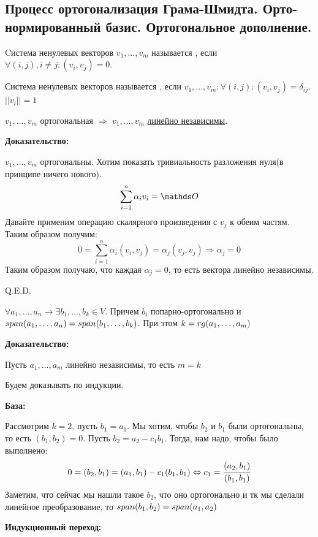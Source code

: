 \pagebreak
\subsection{Процесс ортогонализация Грама-Шмидта. Орто-нормированный базис. Ортогональное дополнение.}

 Cистема ненулевых векторов $v_1,\ldots, v_m$ называется , если $\forall (i,j), i\neq j: (v_i,v_j) =0$.  



 Система ненулевых векторов называется , если $v_1,\ldots, v_m: \forall (i,j): (v_i,v_j) = \delta_{ij}$. $||v_i||= 1$

 $v_1,\ldots, v_m$ ортогональная $\Rightarrow$ $v_1,\ldots , v_m$ \uline{линейно независимы}.

\textbf{Доказательство:}

$v_1,\ldots, v_m$ ортогональны. Хотим показать тривиальность разложения нуля(в принципе ничего нового).
$$\sum\limits_{i=1}^n \alpha_i v_i =\zero$$
Давайте применим операцию скалярного произведения с $v_j$ к обеим частям. Таким образом получим:
$$0 = \sum\limits_{i=1}^n \alpha_i (v_i,v_j)= \alpha_j (v_j,v_j) \Rightarrow \alpha_j =0$$ 
Таким образом получаю, что каждая $\alpha_j = 0$, то есть вектора линейно независимы.

\hfill Q.E.D.



$\forall a_1,\ldots,a_n \rightarrow \exists b_1,\ldots,b_k \in V$. Причем $b_i$ попарно-ортогонально и $span (a_1,\ldots, a_n) = span(b_1,\ldots,b_k)$. При этом $k = rg (a_1,\ldots,a_m)$

\textbf{Доказательство:}

Пусть $a_1,\ldots,a_m$ линейно независимы, то есть $m=k$

Будем доказывать по индукции.

\textbf{База:}

Рассмотрим $k=2$, пусть $b_1 = a_1$. Мы хотим, чтобы $b_2$ и $b_1$ были ортогональны, то есть $(b_1,b_2) = 0$. Пусть $b_2 = a_2 - c_1 b_1$. Тогда, нам надо, чтобы было выполнено:
$$0 = (b_2,b_1) = (a_1,b_1)-c_1(b_1,b_1) \Leftrightarrow c_1 = \cfrac{(a_2,b_1)}{(b_1,b_1)}$$
Заметим, что сейчас мы нашли такое $b_2$, что оно ортогонально и тк мы сделали линейное преобразование, то $span (b_1,b_2) = span (a_1,a_2)$

\textbf{Индукционный переход:}


